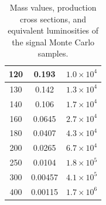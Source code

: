 \begin{table}[htbp]
\begin{tabular}{|c||c|c|}
		\hline
		120	& 0.193 	 	&	$1.0\times10^4$ \\%
		\hline
		130	& 0.142 	 	&	$1.3\times10^4$ \\%
		\hline
		140	& 0.106 	 	&	$1.7\times10^4$ \\%
		\hline
		160	& 0.0645  	&	$2.7\times10^4$ \\%
		\hline
		180	& 0.0407  	&	$4.3\times10^4$ \\%
		\hline
		200	& 0.0265  	&	$6.7\times10^4$ \\%
		\hline
		250	& 0.0104  	&	$1.8\times10^5$ \\%
		\hline
		300	& 0.00457 	&	$4.1\times10^5$ \\%
		\hline
		400	& 0.00115 	&	$1.7\times10^6$ \\%
		\hline
	\end{tabular}
	\caption{Mass values, production cross sections, and equivalent luminosities of the signal Monte Carlo samples.}
	\label{table:resonance-signal-samples}
\end{table}


